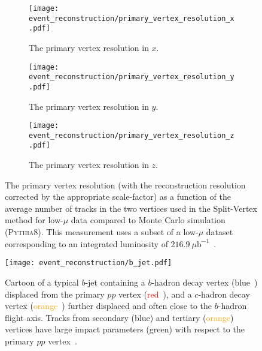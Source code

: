 \begin{figure}[htbp]
 \centering
 \begin{subfigure}[t]{0.315\textwidth}
  \centering
  \texttt{[image: event\_reconstruction/primary\_vertex\_resolution\_x.pdf]}
  \caption[The primary vertex resolution in $x$.]{%
   The primary vertex resolution in $x$.}
  \label{fig:primary_vertex_resolution_x}
 \end{subfigure}%
 \quad
 \begin{subfigure}[t]{0.315\textwidth}
  \centering
  \texttt{[image: event\_reconstruction/primary\_vertex\_resolution\_y.pdf]}
  \caption[The primary vertex resolution in $y$.]{%
   The primary vertex resolution in $y$.}
  \label{fig:primary_vertex_resolution_y}
 \end{subfigure}%
 \quad
 \begin{subfigure}[t]{0.315\textwidth}
  \centering
  \texttt{[image: event\_reconstruction/primary\_vertex\_resolution\_z.pdf]}
  \caption[The primary vertex resolution in $z$.]{%
   The primary vertex resolution in $z$.}
  \label{fig:primary_vertex_resolution_z}
 \end{subfigure}%
 \caption[The primary vertex resolution as a function of the average number of tracks in the two vertices used in the Split-Vertex method for low-$\mu$ data compared to Monte Carlo simulation.]{%
  The primary vertex resolution (with the reconstruction resolution corrected by the appropriate scale-factor) as a function of the average number of tracks in the two vertices used in the Split-Vertex method for low-$\mu$ data compared to Monte Carlo simulation (\textsc{Pythia8}).
  This measurement uses a subset of a low-$\mu$ dataset corresponding to an integrated luminosity of $216.9~\mu\textrm{b}^{-1}$~\cite{ATL-PHYS-PUB-2015-026}.}
 \label{fig:primary_vertex_resolution}
\end{figure}

\begin{figure}[htbp]
 \centering
 \centering
 \texttt{[image: event\_reconstruction/b\_jet.pdf]}
 \caption[Cartoon of a typical $b$-jet.]{%
  Cartoon of a typical $b$-jet containing a $b$-hadron decay vertex (\textcolor{track_blue}{blue}~) displaced from the primary $pp$ vertex (\textcolor{red}{red}~), and a $c$-hadron decay vertex (\textcolor{orange}{orange}~) further displaced and often close to the $b$-hadron flight axis.
  Tracks from secondary (\textcolor{track_blue}{blue}) and tertiary (\textcolor{orange}{orange}) vertices have large impact parameters (\textcolor{IPgreen}{green}) with respect to the primary $pp$ vertex~\cite{Chisholm:bjet}.}
 \label{fig:b_jet}
\end{figure}

